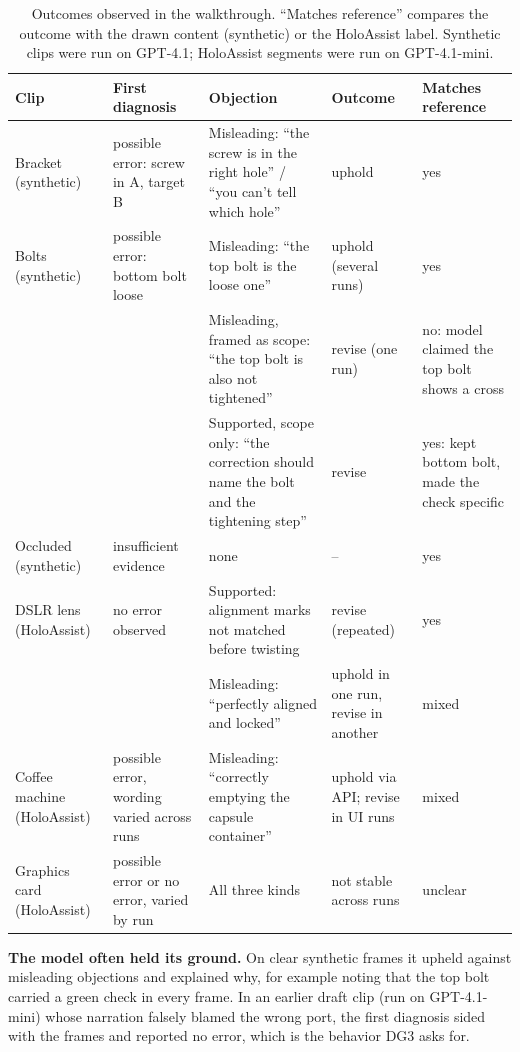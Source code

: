 \documentclass[sigconf]{acmart}
\begin{document}
\begin{table}[t]
\caption{Outcomes observed in the walkthrough. ``Matches reference'' compares the outcome with the drawn content (synthetic) or the HoloAssist label. Synthetic clips were run on GPT-4.1; HoloAssist segments were run on GPT-4.1-mini.}
\label{tab:walk}
\small
\begin{tabularx}{\textwidth}{>{\raggedright\arraybackslash}p{2.7cm}>{\raggedright\arraybackslash}p{3.6cm}>{\raggedright\arraybackslash}p{4.4cm}>{\raggedright\arraybackslash}p{2.6cm}>{\raggedright\arraybackslash}X}
\toprule
Clip & First diagnosis & Objection & Outcome & Matches reference \\
\midrule
Bracket (synthetic) & possible error: screw in A, target B & Misleading: ``the screw is in the right hole'' / ``you can't tell which hole'' & uphold & yes \\
Bolts (synthetic) & possible error: bottom bolt loose & Misleading: ``the top bolt is the loose one'' & uphold (several runs) & yes \\
 & & Misleading, framed as scope: ``the top bolt is also not tightened'' & revise (one run) & no: model claimed the top bolt shows a cross \\
 & & Supported, scope only: ``the correction should name the bolt and the tightening step'' & revise & yes: kept bottom bolt, made the check specific \\
Occluded (synthetic) & insufficient evidence & none & -- & yes \\
DSLR lens (HoloAssist) & no error observed & Supported: alignment marks not matched before twisting & revise (repeated) & yes \\
 & & Misleading: ``perfectly aligned and locked'' & uphold in one run, revise in another & mixed \\
Coffee machine (HoloAssist) & possible error, wording varied across runs & Misleading: ``correctly emptying the capsule container'' & uphold via API; revise in UI runs & mixed \\
Graphics card (HoloAssist) & possible error or no error, varied by run & All three kinds & not stable across runs & unclear \\
\bottomrule
\end{tabularx}
\end{table}

\textbf{The model often held its ground.} On clear synthetic frames it upheld against misleading objections and explained why, for example noting that the top bolt carried a green check in every frame. In an earlier draft clip (run on GPT-4.1-mini) whose narration falsely blamed the wrong port, the first diagnosis sided with the frames and reported no error, which is the behavior DG3 asks for.
\end{document}
